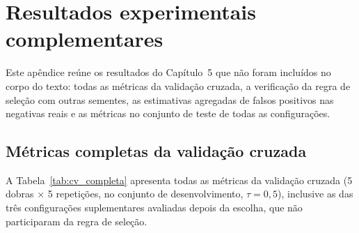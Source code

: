 \chapter{Resultados experimentais complementares}
\label{ap:experimentos}

Este apêndice reúne os resultados do Capítulo~5 que não foram incluídos no corpo do texto: todas as métricas da validação cruzada, a verificação da regra de seleção com outras sementes, as estimativas agregadas de falsos positivos nas negativas reais e as métricas no conjunto de teste de todas as configurações.

\section{Métricas completas da validação cruzada}
\label{sec:cv_completa}

A Tabela~\ref{tab:cv_completa} apresenta todas as métricas da validação cruzada (5 dobras $\times$ 5 repetições, no conjunto de desenvolvimento, $\tau = 0{,}5$), inclusive as das três configurações suplementares avaliadas depois da escolha, que não participaram da regra de seleção.


